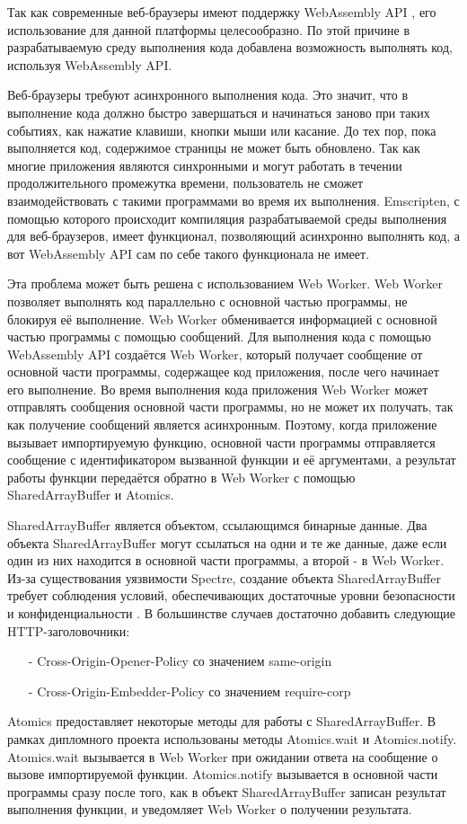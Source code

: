 
Так как современные веб-браузеры имеют поддержку WebAssembly API \cite{WasmBrowserSupport}, его использование для данной платформы целесообразно.
По этой причине в разрабатываемую среду выполнения кода добавлена возможность выполнять код, используя WebAssembly API.

Веб-браузеры требуют асинхронного выполнения кода. 
Это значит, что в выполнение кода должно быстро завершаться и начинаться заново при таких событиях, как нажатие клавиши, кнопки мыши или касание.
До тех пор, пока выполняется код, содержимое страницы не может быть обновлено.
Так как многие приложения являются синхронными и могут работать в течении продолжительного промежутка времени, пользователь не сможет взаимодействовать с такими программами во время их выполнения.
Emscripten, с помощью которого происходит компиляция разрабатываемой среды выполнения для веб-браузеров, имеет функционал, позволяющий асинхронно выполнять код, а вот WebAssembly API сам по себе такого функционала не имеет.

Эта проблема может быть решена с использованием Web Worker.
Web Worker позволяет выполнять код параллельно с основной частью программы, не блокируя её выполнение.
Web Worker обменивается информацией с основной частью программы с помощью сообщений. \cite{WebWorkerMessages}
Для выполнения кода с помощью WebAssembly API создаётся Web Worker, который получает сообщение от основной части программы, содержащее код приложения, после чего начинает его выполнение.
Во время выполнения кода приложения Web Worker может отправлять сообщения основной части программы, но не может их получать, так как получение сообщений является асинхронным.
Поэтому, когда приложение вызывает импортируемую функцию, основной части программы отправляется сообщение с идентификатором вызванной функции и её аргументами, а результат работы функции передаётся обратно в Web Worker с помощью SharedArrayBuffer и Atomics.

SharedArrayBuffer является объектом, ссылающимся бинарные данные.
Два объекта SharedArrayBuffer могут ссылаться на одни и те же данные, даже если один из них находится в основной части программы, а второй - в Web Worker.
Из-за существования уязвимости Spectre, создание объекта SharedArrayBuffer требует соблюдения условий, обеспечивающих достаточные уровни безопасности и конфиденциальности \cite{SharedArrayBuffer}. В большинстве случаев достаточно добавить следующие HTTP-заголовочники:
\begin{itemize}
    \item[-] Cross-Origin-Opener-Policy со значением same-origin 
    \item[-] Cross-Origin-Embedder-Policy со значением require-corp
\end{itemize}

Atomics предоставляет некоторые методы для работы с SharedArrayBuffer.
В рамках дипломного проекта использованы методы Atomics.wait и Atomics.notify.
Atomics.wait вызывается в Web Worker при ожидании ответа на сообщение о вызове импортируемой функции.
Atomics.notify вызывается в основной части программы сразу после того, как в объект SharedArrayBuffer записан результат выполнения функции, и уведомляет Web Worker о получении результата.

